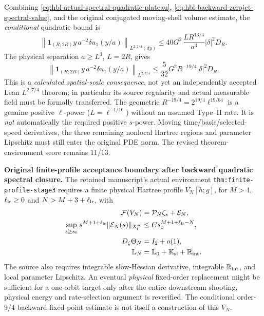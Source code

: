 \documentclass[11pt]{amsart}
\begin{document}
Combining \eqref{eq:hbl-actual-spectral-quadratic-plateau},
\eqref{eq:hbl-backward-zerojet-spectral-value}, and the
original conjugated moving-shell volume estimate, the
\emph{conditional} quadratic bound is
\[
 \left\|
 \mathbf 1_{(R,2R)}y\,a^{-2}\delta u_1(y/a)
 \right\|_{L^{2,7/4}(dy)}
 \le40G^2\,\frac{LR^{13/4}}{a^3}
       |\delta|^2D_R.
\]
The physical separation \(a\ge L^3\), \(L=2R\), gives
\begin{equation}
 \boxed{\quad
 \left\|\mathbf 1_{(R,2R)}
       y\,a^{-2}\delta u_1(y/a)\right\|_{L^{2,7/4}}
 \le \frac{5}{32}G^2R^{-19/4}|\delta|^2D_R.
 \quad}
 \label{eq:hbl-backward-spectral-weighted-quadratic}
\end{equation}
This is a \emph{calculated spatial-scale consequence},
not yet an independently accepted Lean
\(L^{2,7/4}\) theorem; in particular its
source regularity and actual measurable field must be
formally transferred. The geometric
\(R^{-19/4}=2^{19/4}\ell^{19/64}\)
is a genuine positive \(\ell\)-power
(\(L=\ell^{-1/16}\)) without an assumed Type--II rate.
It is \emph{not} automatically the required positive
\(s\)-power. Moving time/basis/selected-speed derivatives,
the three remaining nonlocal Hartree regions and parameter
Lipschitz must still enter the original PDE norm.
The revised theorem-environment score remains \(11/13\).



\medskip
\noindent\textbf{Original finite-profile acceptance boundary after backward quadratic spectral closure.}
The retained manuscript's actual environment
\texttt{thm:finite-profile-stage3} requires a finite physical
Hartree profile \(V_N[h;g]\), for \(M>4\),
\(\ell_{\rm lr}\ge0\) and \(N>M+3+\ell_{\rm lr}\), with
\[
\begin{aligned}
 \mathcal F(V_N)&=\mathcal P_N\zeta_s+\mathcal E_N,\\
 \sup_{s\ge s_0}s^{M+1+\ell_{\rm lr}}
  \|\mathcal E_N(s)\|_{X_{\rm f}^{\rm sc}}
   &\le Cs_0^{M+1+\ell_{\rm lr}-N},\\
 D_\zeta\Theta_N&=I_2+o(1),\\
 \mathbb L_N&=\mathbb L_0+\mathbb K_{\rm sl}
                  +\mathbb R_{\rm int}.
\end{aligned}
\]
The source also requires integrable slow-Hessian derivative,
integrable \(\mathbb R_{\rm int}\), and local parameter Lipschitz.
An eventual \emph{physical} fixed-order replacement might be
sufficient for a one-orbit target only after the entire downstream
shooting, physical energy and rate-selection argument is
reverified. The conditional order-\(9/4\) backward fixed-point
estimate is not itself a construction of this \(V_N\).
\end{document}
